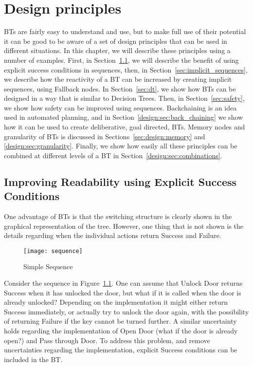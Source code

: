 
\chapter{Design principles}
\label{ch:design_principles}
\graphicspath{{design/}}

BTs are fairly easy to understand and use, but to make full use of their potential it can be good to be aware of a set of design principles that can be used in different situations. In this chapter, we will describe these principles using a number of examples.
First, in Section~\ref{sec:explicit_conditions}, we will describe the benefit of using explicit success conditions in sequences,
then, in Section~\ref{sec:implicit_sequences}, we describe how the reactivity of a BT can be increased by creating implicit sequences, using Fallback nodes.
In Section~\ref{sec:dt}, we show how BTs can  be designed in a way that is similar to Decision Trees.
Then, in Section~\ref{sec:safety}, we show how safety can be improved using sequences.
Backchaining is an idea used in automated planning, and in Section~\ref{design:sec:back_chaining} we show how it can be used to create
deliberative, goal directed, BTs.
Memory nodes and granularity of BTs is discussed in 
 Sections~\ref{sec:design:memory} and \ref{design:sec:granularity}.
Finally, we show how easily all these principles can be combined at different levels of a BT in Section~\ref{design:sec:combinations}.




\section{Improving Readability using Explicit Success Conditions}
\label{sec:explicit_conditions}

One advantage of BTs is that the switching structure is clearly shown in the graphical representation of the tree. However, one thing that is not shown is the details regarding when the individual actions return  Success and Failure.

\begin{figure}[h]
\centering
\texttt{[image: sequence]}
\caption{Simple Sequence}
\label{design:fig:sequence}
\end{figure}
 Consider the sequence in Figure~\ref{design:fig:sequence}. One can assume that Unlock Door returns Success when it has unlocked the door, but what if it is called when the door is already unlocked? Depending on the implementation it might either return Success immediately, or actually try to unlock the door again, with the possibility of returning Failure if the key cannot be turned further. A similar uncertainty holds regarding the implementation of Open Door (what if the door is already open?) and Pass through Door.
 To address this problem, and remove uncertainties regarding the implementation, explicit Success conditions can be included in the BT.


